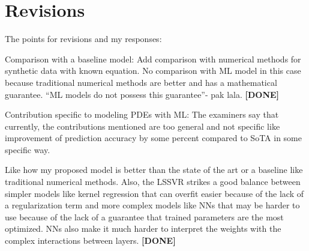 \documentclass[a4paper,12pt]{scrreprt}
\begin{document}




\section*{Revisions}
The points for revisions and my responses:
\begin{numdesc}
    \item[Comparison with a baseline model:] Add comparison with numerical methods for synthetic data with known equation. No comparison with ML model in this case because traditional numerical methods are better and has a mathematical guarantee. \enquote{ML models do not possess this guarantee}- pak lala. \textbf{[DONE]}
    \item[Contribution specific to modeling PDEs with ML:] The examiners say that currently, the contributions mentioned are too general and not specific like improvement of prediction accuracy by some percent compared to SoTA in some specific way.

    Like how my proposed model is better than the state of the art or a baseline like traditional numerical methods\@. Also, the LSSVR strikes a good balance between simpler models like kernel regression that can overfit easier because of the lack of a regularization term and more complex models like NNs that may be harder to use because of the lack of a guarantee that trained parameters are the most optimized. NNs also make it much harder to interpret the weights with the complex interactions between layers. \textbf{[DONE]}


\end{numdesc}
\end{document}
